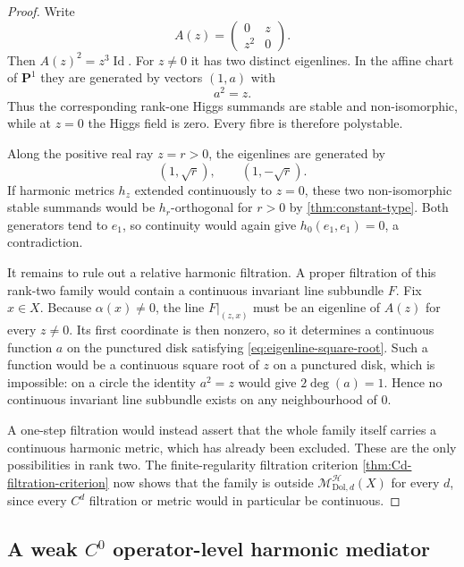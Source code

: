 \documentclass[11pt,reqno]{amsart}
\theoremstyle{definition}
\theoremstyle{remark}
\newcommand{\cH}{\mathcal H}
\newcommand{\Id}{\operatorname{Id}}
\newcommand{\Dol}{\mathrm{Dol}}
\begin{document}
\begin{proof}
Write
\[
  A(z)=
  \begin{pmatrix}
    0&z\\
    z^2&0
  \end{pmatrix}.
\]
Then $A(z)^2=z^3\Id$.  For $z\ne0$ it has two distinct eigenlines.  In the affine chart of $\mathbf P^1$ they are generated by vectors $(1,a)$ with
\begin{equation}\label{eq:eigenline-square-root}
  a^2=z.
\end{equation}
Thus the corresponding rank-one Higgs summands are stable and non-isomorphic, while at $z=0$ the Higgs field is zero.  Every fibre is therefore polystable.

Along the positive real ray $z=r>0$, the eigenlines are generated by
\[
  (1,\sqrt r),
  \qquad
  (1,-\sqrt r).
\]
If harmonic metrics $h_z$ extended continuously to $z=0$, these two non-isomorphic stable summands would be $h_r$-orthogonal for $r>0$ by \cref{thm:constant-type}.  Both generators tend to $e_1$, so continuity would again give $h_0(e_1,e_1)=0$, a contradiction.

It remains to rule out a relative harmonic filtration.  A proper filtration of this rank-two family would contain a continuous invariant line subbundle $F$.  Fix $x\in X$.  Because $\alpha(x)\ne0$, the line $F|_{(z,x)}$ must be an eigenline of $A(z)$ for every $z\ne0$.  Its first coordinate is then nonzero, so it determines a continuous function $a$ on the punctured disk satisfying \eqref{eq:eigenline-square-root}.  Such a function would be a continuous square root of $z$ on a punctured disk, which is impossible: on a circle the identity $a^2=z$ would give $2\deg(a)=1$.  Hence no continuous invariant line subbundle exists on any neighbourhood of $0$.

A one-step filtration would instead assert that the whole family itself carries a continuous harmonic metric, which has already been excluded.  These are the only possibilities in rank two.  The finite-regularity filtration criterion \cref{thm:Cd-filtration-criterion} now shows that the family is outside $\mathscr M_{\Dol,d}^{\cH}(X)$ for every $d$, since every $C^d$ filtration or metric would in particular be continuous.
\end{proof}

\subsection{A weak \texorpdfstring{$C^0$}{C0} operator-level harmonic mediator}\label{subsec:weak-C0-mediator}
\end{document}
